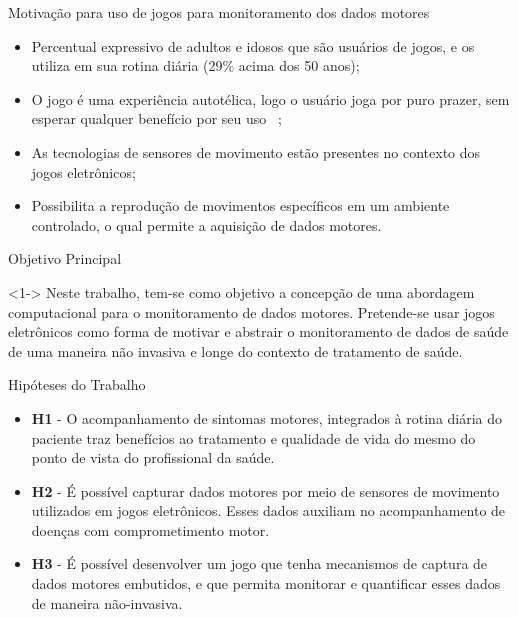 \documentclass{beamer}
\begin{document}
\begin{frame}{Motivação para uso de jogos para monitoramento dos dados motores}
	\begin{block}{}
	\begin{itemize}[<+->]
			\item Percentual expressivo de adultos e idosos que são usuários de jogos, e os utiliza em sua rotina diária (29\% acima dos 50 anos);
      \item O  jogo é uma experiência autotélica, logo o usuário joga por puro prazer, sem esperar qualquer benefício por seu uso ~\cite{sweetser2005-gameflow};
			\item As tecnologias de sensores de movimento estão presentes no contexto dos jogos eletrônicos;
			\item Possibilita a reprodução de movimentos específicos em um ambiente controlado, o qual permite a aquisição de dados motores.
	\end{itemize}
	\end{block}
\end{frame}


\begin{frame}{Objetivo Principal}
  \begin{block}{}<1->
Neste trabalho, tem-se como objetivo a concepção de uma abordagem computacional para o monitoramento de dados motores. Pretende-se usar jogos eletrônicos como forma de motivar e abstrair o monitoramento de dados de saúde de uma maneira não invasiva e longe do contexto de tratamento de saúde.
  \end{block}
\end{frame}


\begin{frame}{Hipóteses do Trabalho}
	\begin{block}{}
			\begin{itemize}[<+->]
       \item \textbf{H1} - O acompanhamento de sintomas motores, integrados à rotina diária do paciente traz benefícios ao tratamento e qualidade de vida do mesmo do ponto de vista do profissional da saúde.
       \item \textbf{H2} - É possível capturar dados motores por meio de sensores de movimento utilizados em jogos eletrônicos. Esses dados auxiliam no acompanhamento de doenças com comprometimento motor.
			\item \textbf{H3} - É possível desenvolver um jogo que tenha mecanismos de captura de dados motores embutidos, e que permita monitorar e quantificar esses dados de maneira não-invasiva.
			\end{itemize}
	\end{block}
\end{frame}
\end{document}
